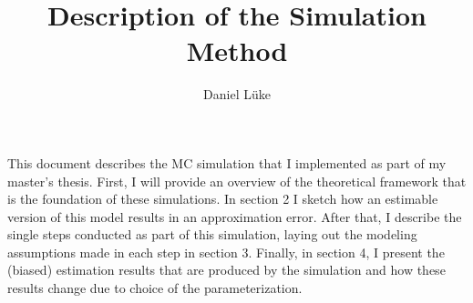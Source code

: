 \documentclass{article}
\title{Description of the Simulation Method}
\author{Daniel Lüke}
\begin{document}
\maketitle

	This document describes the MC simulation that I implemented as part of my master's thesis. First, I will provide an overview of the theoretical framework that is the foundation of these simulations. In section 2 I sketch how an estimable version of this model results in an approximation error. After that, I describe the single steps conducted as part of this simulation, laying out the modeling assumptions made in each step in section 3. Finally, in section 4, I present the (biased) estimation results that are produced by the simulation and how these results change due to choice of the parameterization.\\
\end{document}
